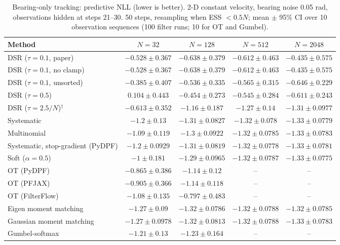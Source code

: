 \begin{table}[H]
\centering
\small
\caption{Bearing-only tracking: predictive NLL (lower is better). 2-D constant velocity, bearing noise 0.05 rad, observations hidden at steps 21--30. 50 steps, resampling when ESS $<0.5N$; mean $\pm$ 95\% CI over 10 observation sequences (100 filter runs; 10 for OT and Gumbel).}
\label{tab:bearing-predictive_nll}
\begin{adjustbox}{max width=\linewidth}
\begin{tabular}{lcccc}
\toprule
Method & $N{=}32$ & $N{=}128$ & $N{=}512$ & $N{=}2048$ \\
\midrule
DSR ($\tau{=}0.1$, paper) & $-0.528\pm0.367$ & $-0.638\pm0.379$ & $-0.612\pm0.463$ & $-0.435\pm0.575$ \\
DSR ($\tau{=}0.1$, no clamp) & $-0.528\pm0.367$ & $-0.638\pm0.379$ & $-0.612\pm0.463$ & $-0.435\pm0.575$ \\
DSR ($\tau{=}0.1$, unsorted) & $-0.385\pm0.407$ & $-0.536\pm0.335$ & $-0.565\pm0.315$ & $-0.646\pm0.229$ \\
DSR ($\tau{=}0.5$) & $0.104\pm0.443$ & $-0.454\pm0.273$ & $-0.545\pm0.284$ & $-0.611\pm0.243$ \\
DSR ($\tau{=}2.5/N$)$^\dagger$ & $-0.613\pm0.352$ & $-1.16\pm0.187$ & $-1.27\pm0.14$ & $-1.31\pm0.0977$ \\
\midrule
Systematic & $-1.2\pm0.13$ & $-1.31\pm0.0827$ & $-1.32\pm0.078$ & $-1.33\pm0.0779$ \\
Multinomial & $-1.09\pm0.119$ & $-1.3\pm0.0922$ & $\mathbf{-1.32\pm0.0785}$ & $-1.33\pm0.0783$ \\
Systematic, stop-gradient (PyDPF) & $-1.2\pm0.0929$ & $-1.31\pm0.0819$ & $-1.32\pm0.0778$ & $-1.33\pm0.0781$ \\
Soft ($\alpha{=}0.5$) & $-1\pm0.181$ & $-1.29\pm0.0965$ & $-1.32\pm0.0787$ & $\mathbf{-1.33\pm0.0775}$ \\
OT (PyDPF) & $-0.865\pm0.386$ & $-1.14\pm0.12$ & -- & -- \\
OT (PFJAX) & $-0.905\pm0.366$ & $-1.14\pm0.118$ & -- & -- \\
OT (FilterFlow) & $-1.08\pm0.135$ & $-0.797\pm0.483$ & -- & -- \\
Eigen moment matching & $-1.27\pm0.09$ & $\mathbf{-1.32\pm0.0786}$ & $-1.32\pm0.0788$ & $-1.32\pm0.0785$ \\
Gaussian moment matching & $\mathbf{-1.27\pm0.0978}$ & $-1.32\pm0.0813$ & $-1.32\pm0.0788$ & $-1.33\pm0.0783$ \\
Gumbel-softmax & $-1.21\pm0.13$ & $-1.23\pm0.164$ & -- & -- \\

\end{tabular}
\end{adjustbox}
\end{table}
